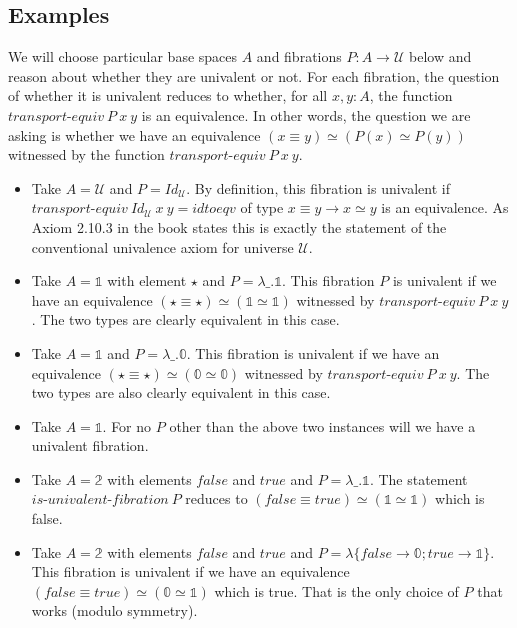 \documentclass[format=acmlarge,review,natbib]{acmart}
\newcommand{\zt}{\mathbb{0}}
\newcommand{\ot}{\mathbb{1}}
\newcommand{\bt}{\mathbb{2}}
\newcommand{\fc}{\mathit{false}}
\newcommand{\tc}{\mathit{true}}
\begin{document}
\subsection{Examples}

We will choose particular base spaces $A$ and fibrations $P : A \to \mathcal{U}$
below and reason about whether they are univalent or not. For each fibration,
the question of whether it is univalent reduces to whether, for all $x,y:A$, the
function $\textit{transport-equiv}~P~x~y$ is an equivalence. In other words, the
question we are asking is whether we have an equivalence
$(x \equiv y) \simeq (P(x) \simeq P(y))$ witnessed by the function
$\textit{transport-equiv}~P~x~y$.

\begin{itemize}

\item Take $A = \mathcal{U}$ and $P = \mathit{Id}_{\mathcal{U}}$. By definition,
  this fibration is univalent if
  $\textit{transport-equiv}~\mathit{Id}_{\mathcal{U}}~x~y = \mathit{idtoeqv}$ of
    type $x \equiv y \to x \simeq y$ is an equivalence. As Axiom 2.10.3 in the
    book states this is exactly the statement of the conventional univalence
    axiom for universe $\mathcal{U}$.

\item Take $A = \ot$ with element $\star$ and $P = \lambda \_. \ot$. This
    fibration $P$ is univalent if we have an equivalence
    $(\star\equiv\star) \simeq (\ot\simeq\ot)$ witnessed by
    $\textit{transport-equiv}~P~x~y$. The two types are clearly equivalent in
    this case.

\item Take $A = \ot$ and $P = \lambda \_. \zt$. This fibration is univalent if
    we have an equivalence $(\star\equiv\star)\simeq(\zt\simeq\zt)$ witnessed by
    $\textit{transport-equiv}~P~x~y$. The two types are also clearly equivalent
    in this case.

\item Take $A = \ot$. For no $P$ other than the above two instances will we
    have a univalent fibration.

\item Take $A = \bt$ with elements $\fc$ and $\tc$ and
  $P = \lambda \_. \ot$. The statement
  $\textit{is-univalent-fibration}~P$ reduces to $(\fc \equiv \tc) \simeq
  (\ot\simeq\ot)$ which is false.

\item Take $A = \bt$ with elements $\fc$ and $\tc$ and
  $P = \lambda \{ \fc \to \zt; \tc \to \ot \}$. This fibration is univalent if
  we have an equivalence $(\fc \equiv \tc) \simeq (\zt\simeq\ot)$ which is
  true. That is the only choice of $P$ that works (modulo symmetry).


\end{itemize}
\end{document}
